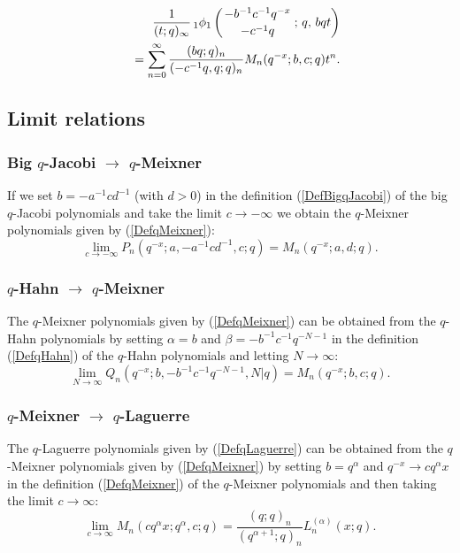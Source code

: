 \documentclass[envcountchap,graybox]{svmono}
\newcounter{rom}
\newcommand{\qhyp}[5]{\mbox{}_{#1}{\phi}_{#2}
\left(\genfrac{}{}{0pt}{}{#3}{#4}\,;\,q,\,#5\right)}
\begin{document}
\begin{eqnarray}
\label{GenqMeixner2}
& &\frac{1}{(t;q)_{\infty}}\,\qhyp{1}{1}{-b^{-1}c^{-1}q^{-x}}{-c^{-1}q}{bqt}\nonumber\\
& &{}=\sum_{n=0}^{\infty}\frac{(bq;q)_n}{(-c^{-1}q,q;q)_n}M_n(q^{-x};b,c;q)t^n.
\end{eqnarray}

\subsection*{Limit relations}

\subsubsection*{Big $q$-Jacobi $\rightarrow$ $q$-Meixner}
If we set $b=-a^{-1}cd^{-1}$ (with $d>0$) in the definition (\ref{DefBigqJacobi})
of the big $q$-Jacobi polynomials and take the limit $c\rightarrow -\infty$ we
obtain the $q$-Meixner polynomials given by (\ref{DefqMeixner}):
\begin{equation}
\lim_{c\rightarrow -\infty}P_n(q^{-x};a,-a^{-1}cd^{-1},c;q)=M_n(q^{-x};a,d;q).
\end{equation}

\subsubsection*{$q$-Hahn $\rightarrow$ $q$-Meixner}
The $q$-Meixner polynomials given by (\ref{DefqMeixner}) can be obtained from the $q$-Hahn polynomials
by setting $\alpha=b$ and $\beta=-b^{-1}c^{-1}q^{-N-1}$ in the definition (\ref{DefqHahn}) of the
$q$-Hahn polynomials and letting $N\rightarrow\infty$:
$$\lim_{N\rightarrow\infty}Q_n(q^{-x};b,-b^{-1}c^{-1}q^{-N-1},N|q)=M_n(q^{-x};b,c;q).$$

\subsubsection*{$q$-Meixner $\rightarrow$ $q$-Laguerre}
The $q$-Laguerre polynomials given by (\ref{DefqLaguerre}) can be obtained
from the $q$-Meixner polynomials given by (\ref{DefqMeixner}) by setting
$b=q^{\alpha}$ and $q^{-x}\rightarrow cq^{\alpha}x$ in the definition
(\ref{DefqMeixner}) of the $q$-Meixner polynomials and then taking the limit
$c\rightarrow\infty$:
\begin{equation}
\lim_{c\rightarrow\infty}M_n(cq^{\alpha}x;q^{\alpha},c;q)=
\frac{(q;q)_n}{(q^{\alpha+1};q)_n}L_n^{(\alpha)}(x;q).
\end{equation}
\end{document}
